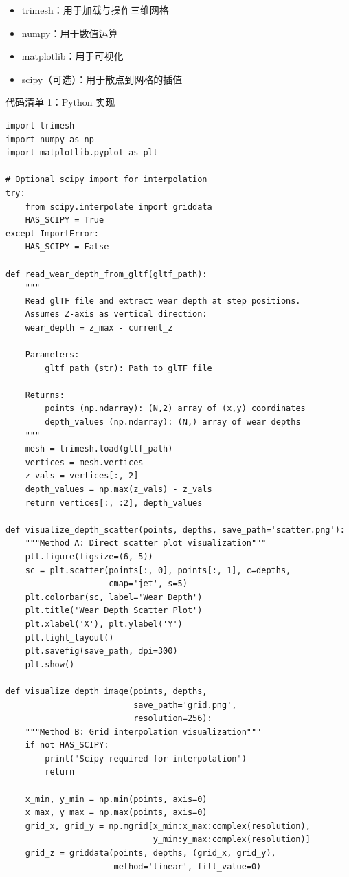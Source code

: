 \documentclass[11pt,a4paper]{ctexart}
\begin{document}
\begin{itemize}[itemsep=2pt,topsep=2pt]
\item trimesh：用于加载与操作三维网格
\item numpy：用于数值运算
\item matplotlib：用于可视化
\item scipy（可选）：用于散点到网格的插值
\end{itemize}

\noindent 代码清单 1：Python 实现

\begin{lstlisting}
import trimesh
import numpy as np
import matplotlib.pyplot as plt

# Optional scipy import for interpolation
try:
    from scipy.interpolate import griddata
    HAS_SCIPY = True
except ImportError:
    HAS_SCIPY = False

def read_wear_depth_from_gltf(gltf_path):
    """
    Read glTF file and extract wear depth at step positions.
    Assumes Z-axis as vertical direction:
    wear_depth = z_max - current_z

    Parameters:
        gltf_path (str): Path to glTF file

    Returns:
        points (np.ndarray): (N,2) array of (x,y) coordinates
        depth_values (np.ndarray): (N,) array of wear depths
    """
    mesh = trimesh.load(gltf_path)
    vertices = mesh.vertices
    z_vals = vertices[:, 2]
    depth_values = np.max(z_vals) - z_vals
    return vertices[:, :2], depth_values

def visualize_depth_scatter(points, depths, save_path='scatter.png'):
    """Method A: Direct scatter plot visualization"""
    plt.figure(figsize=(6, 5))
    sc = plt.scatter(points[:, 0], points[:, 1], c=depths,
                     cmap='jet', s=5)
    plt.colorbar(sc, label='Wear Depth')
    plt.title('Wear Depth Scatter Plot')
    plt.xlabel('X'), plt.ylabel('Y')
    plt.tight_layout()
    plt.savefig(save_path, dpi=300)
    plt.show()

def visualize_depth_image(points, depths,
                          save_path='grid.png',
                          resolution=256):
    """Method B: Grid interpolation visualization"""
    if not HAS_SCIPY:
        print("Scipy required for interpolation")
        return

    x_min, y_min = np.min(points, axis=0)
    x_max, y_max = np.max(points, axis=0)
    grid_x, grid_y = np.mgrid[x_min:x_max:complex(resolution),
                              y_min:y_max:complex(resolution)]
    grid_z = griddata(points, depths, (grid_x, grid_y),
                      method='linear', fill_value=0)


\end{lstlisting}
\end{document}
